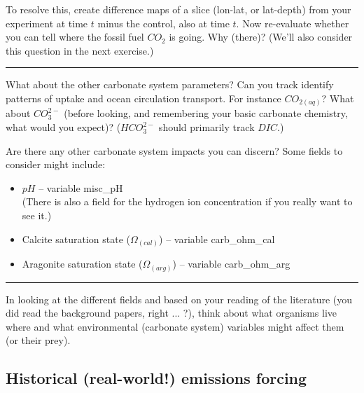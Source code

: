 To resolve this, create difference maps of a slice (lon-lat, or lat-depth) from your experiment at time \(t\) minus the control, also at time \(t\). Now re-evaluate whether you can tell where the fossil fuel \(CO_{2}\) is going. Why (there)? (We'll also consider this question in the next exercise.)

\vspace{1mm}
\noindent\rule{4cm}{0.1mm}
\vspace{2mm}

\noindent What about the other carbonate system parameters? Can you track identify patterns of uptake and ocean circulation transport. For instance \(CO_{2(aq)}\)? What about \(CO^{2-}_{3}\) (before looking, and remembering your basic carbonate chemistry, what would you expect)? (\(HCO^{2-}_{3}\) should primarily track \(DIC\).)

Are there any other carbonate system impacts you can discern? Some fields to consider might include:

\vspace{1mm}
\begin{itemize}[noitemsep]
\item \(pH\) -- variable \textsf{\footnotesize misc\_pH} 
\\(There is also a field for the hydrogen ion concentration if you really want to see it.)
\item Calcite saturation state (\(\Omega_{(cal)}\)) -- variable \textsf{\footnotesize carb\_ohm\_cal}
\item Aragonite saturation state (\(\Omega_{(arg)}\)) -- variable \textsf{\footnotesize carb\_ohm\_arg} 
\end{itemize}

\vspace{1mm}
\noindent\rule{4cm}{0.1mm}
\vspace{2mm}

\noindent In looking at the different fields and based on your reading of the literature (you did read the background papers, right ... ?), think about what organisms live where and what environmental (carbonate system) variables might affect them (or their prey).

\newpage

\subsection{Historical (real-world!) emissions forcing}

